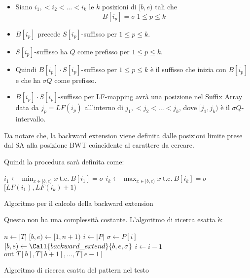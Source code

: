\begin{itemize}
    \item Siano $i_1,<i_2<\dots<i_k$ le $k$ posizioni di $[b,e)$ tali che
          \begin{equation}
              B[i_p] = \sigma \ 1\le p \le k
          \end{equation}
    \item $B[i_p]$ precede $S[i_p]$-suffisso per $1\le p \le k$.
    \item $S[i_p]$-suffisso ha $Q$ come prefisso per $1\le p \le k$.
    \item Quindi  $B[i_p] \cdot S[i_p]$-suffisso per $1\le p \le k$ è il suffisso
          che inizia con $B[i_p]$ e che ha $\sigma Q$ come prefisso.
    \item $B[i_p] \cdot S[i_p]$-suffisso per LF-mapping avrà una posizione
          nel Suffix Array data da $j_p = LF(i_p)$ all'interno di  $j_1,<j_2<\dots<j_k$,
          dove $[j_1,j_k)$ è il $\sigma Q$-intervallo.
\end{itemize}
Da notare che, la backward extension viene definita dalle posizioni limite prese
dal SA alla posizione BWT coincidente al carattere da cercare.

Quindi la procedura sarà definita come:

\begin{algorithm}
    \begin{algorithmic}
        \State $i_1 \gets \min_{x\in [b,e)} x \ \text{t.c.} \ B[i_1]=\sigma$
        \State $i_k \gets \max_{x\in [b,e)} x \ \text{t.c.} \ B[i_k]=\sigma$
        \State \Return $[LF(i_1), LF(i_k)+1)$
        \EndFunction
    \end{algorithmic}
    \caption{Algoritmo per il calcolo della backward extension}
\end{algorithm}

Questo non ha una complessità costante. L'algoritmo di ricerca esatta è:

\begin{algorithm}
    \begin{algorithmic}
        \State $n \gets |T|$
        \State $[b,e) \gets [1, n+1)$
        \State $i \gets |P|$
        \While{$[b,e) \ \ne \ \text{null}\land i\ge 1$}
        \State $\sigma \gets P[i]$
        \State $[b,e) \gets\Call{backward\_extend}{b,e,\sigma}$
        \State $i\gets i-1$
        \EndWhile
        \If{$[b,e)\ \ne \ \text{null}$}
        \State $\text{out } T[b], T[b+1], \dots, T[e-1]$
        \EndIf
        \EndFunction
    \end{algorithmic}
    \caption{Algoritmo di ricerca esatta del pattern nel testo}
\end{algorithm}

